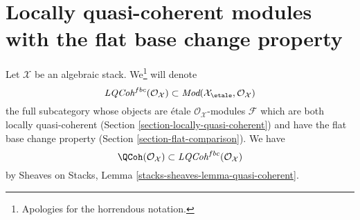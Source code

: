 \section{Locally quasi-coherent modules with the flat base change property}
\label{section-loc-qcoh-flat-base-change}

\noindent
Let $\mathcal{X}$ be an algebraic stack. We\footnote{Apologies
for the horrendous notation.} will denote
$$
\textit{LQCoh}^{fbc}(\mathcal{O}_\mathcal{X})
\subset
\textit{Mod}(\mathcal{X}_\etale, \mathcal{O}_\mathcal{X})
$$
the full subcategory whose objects are \'etale
$\mathcal{O}_\mathcal{X}$-modules $\mathcal{F}$
which are both locally quasi-coherent
(Section \ref{section-locally-quasi-coherent})
and have the flat base change property
(Section \ref{section-flat-comparison}).
We have
$$
\QCoh(\mathcal{O}_\mathcal{X}) \subset
\textit{LQCoh}^{fbc}(\mathcal{O}_\mathcal{X})
$$
by Sheaves on Stacks, Lemma \ref{stacks-sheaves-lemma-quasi-coherent}.

